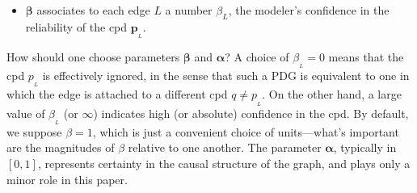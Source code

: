 \documentclass[twoside]{article}
\theoremstyle{plain}
\theoremstyle{definition}
\newcommand{\mat}[1]{\mathbf{#1}}
\newcommand{\ssub}[1]{_{\!_{#1}\!}}
\newcommand{\bp}[1][L]{\mat{p}\ssub{#1}}
\newcommand{\balpha}{\boldsymbol\alpha}
\newcommand{\bbeta}{\boldsymbol\beta}
\begin{document}
\begin{defn}
\begin{itemize}[leftmargin=1.5em, itemsep=0pt]
		\item $\boldsymbol\beta$
		associates to each edge $L$ a number $\beta_L$,
		the modeler's confidence in the reliability of
		the cpd
		$\bp$.%
	    \qedhere
    \end{itemize}%
\end{defn}

How should one choose parameters $\bbeta$ and $\balpha$?
A choice of $\beta\ssub L=0$ means that the cpd $p\ssub L$ is effectively ignored, in the sense that such a PDG is equivalent to one in which the edge is attached to a different cpd $q \ne p\ssub L$.
On the other hand, a large value of $\beta\ssub L$ (or $\infty$) indicates high (or absolute) confidence in the cpd. By default, we suppose $\beta\!=\! 1$, which is just a convenient choice of units---what’s important are the magnitudes of $\beta$ relative to one another.
The parameter $\balpha$, typically in $[0,1]$, represents certainty in the causal structure of the graph, and plays only a minor role in this paper.
\end{document}
